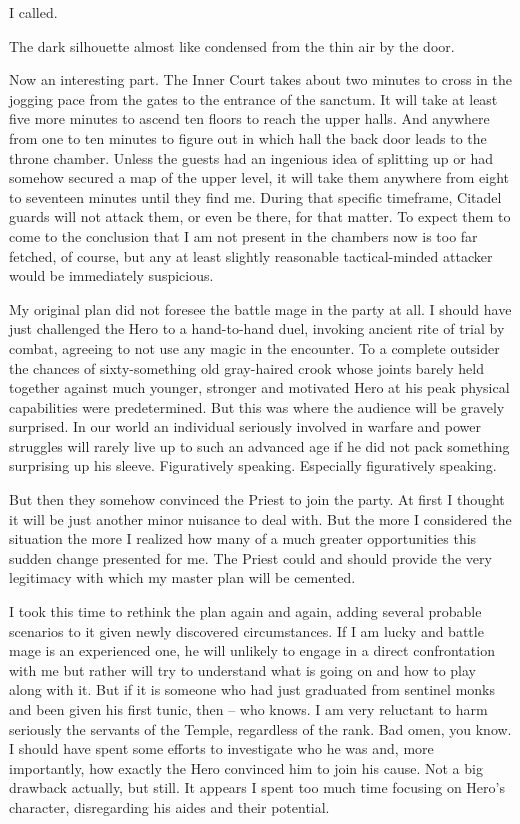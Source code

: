  I called.

 The dark silhouette almost like condensed from the thin air by the door.



Now an interesting part. The Inner Court takes about two minutes to cross in the jogging pace from the gates to the entrance of the sanctum. It will take at least five more minutes to ascend ten floors to reach the upper halls. And anywhere from one to ten minutes to figure out in which hall the back door leads to the throne chamber. Unless the guests had an ingenious idea of splitting up or had somehow secured a map of the upper level, it will take them anywhere from eight to seventeen minutes until they find me. During that specific timeframe, Citadel guards will not attack them, or even be there, for that matter. To expect them to come to the conclusion that I am not present in the chambers now is too far fetched, of course, but any at least slightly reasonable tactical-minded attacker would be immediately suspicious.

My original plan did not foresee the battle mage in the party at all. I should have just challenged the Hero to a hand-to-hand duel, invoking ancient rite of trial by combat, agreeing to not use any magic in the encounter. To a complete outsider the chances of sixty-something old gray-haired crook whose joints barely held together against much younger, stronger and motivated Hero at his peak physical capabilities were predetermined. But this was where the audience will be gravely surprised. In our world an individual seriously involved in warfare and power struggles will rarely live up to such an advanced age if he did not pack something surprising up his sleeve. Figuratively speaking. Especially figuratively speaking.

But then they somehow convinced the Priest to join the party. At first I thought it will be just another minor nuisance to deal with. But the more I considered the situation the more I realized how many of a much greater opportunities this sudden change presented for me. The Priest could and should provide the very legitimacy with which my master plan will be cemented.

I took this time to rethink the plan again and again, adding several probable scenarios to it given newly discovered circumstances. If I am lucky and battle mage is an experienced one, he will unlikely to engage in a direct confrontation with me but rather will try to understand what is going on and how to play along with it. But if it is someone who had just graduated from sentinel monks and been given his first tunic, then -- who knows. I am very reluctant to harm seriously the servants of the Temple, regardless of the rank. Bad omen, you know. I should have spent some efforts to investigate who he was and, more importantly, how exactly the Hero convinced him to join his cause. Not a big drawback actually, but still. It appears I spent too much time focusing on Hero's character, disregarding his aides and their potential.

